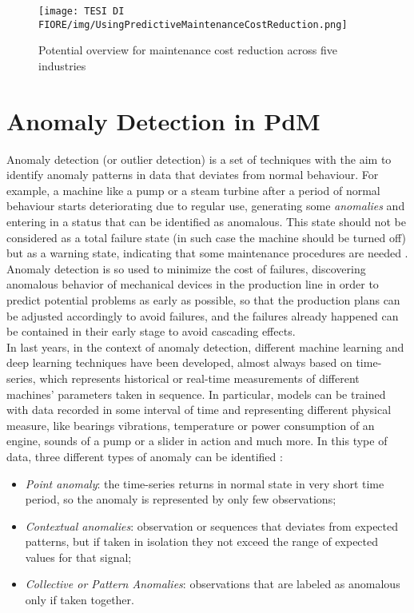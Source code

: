 \begin{figure}[ht]
\texttt{[image: TESI DI FIORE/img/UsingPredictiveMaintenanceCostReduction.png]}
\centering
\caption{Potential overview for maintenance cost reduction across five industries \cite{11PorscheStudy}}
\label{predictive_maintenance_reduction_costs}
\end{figure}


\section{Anomaly Detection in PdM}
Anomaly detection (or outlier detection) is a set of techniques with the aim to identify anomaly patterns in data that deviates from normal behaviour. For example, a machine like a pump or a steam turbine after a period of normal behaviour starts deteriorating due to regular use, generating some \textit{anomalies} and entering in a status that can be identified as anomalous. This state should not be considered as a total failure state (in such case the machine should be turned off) but as a warning state, indicating that some maintenance procedures are needed \cite{5AnomalyDetectionSurvey}. Anomaly detection is so used to minimize the cost of failures, discovering anomalous behavior of mechanical devices in the production line in order to predict potential problems as early as possible, so that the production plans can be adjusted accordingly to avoid failures, and the failures already happened can be contained in their early stage to avoid cascading effects.\\
In last years, in the context of anomaly detection, different machine learning and deep learning techniques have been developed, almost always based on time-series, which represents historical or real-time measurements of different machines' parameters taken in sequence. In particular, models can be trained with data recorded in some interval of time and representing different physical measure, like bearings vibrations, temperature or power consumption of an engine, sounds of a pump or a slider in action and much more. In this type of data, three different types of anomaly can be identified \cite{6AnomalyIoTTimeSeries}: 
\begin{itemize}
\item{\textit{Point anomaly}: the time-series returns in normal state in very short time period, so the anomaly is represented by only few observations;}
\item{\textit{Contextual anomalies}: observation or sequences that deviates from expected patterns, but if taken in isolation they not exceed the range of expected values for that signal;}
\item{\textit{Collective or Pattern Anomalies}: observations that are labeled as anomalous only if taken together.}
\end{itemize}
